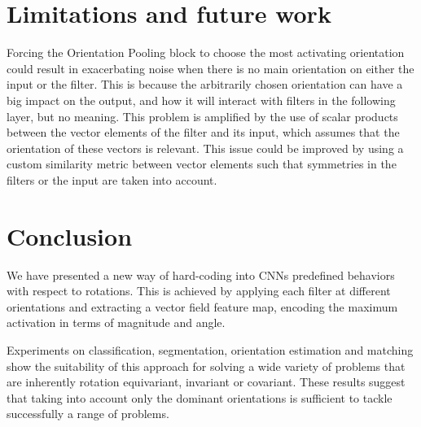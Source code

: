 \documentclass[10pt,twocolumn,letterpaper,table]{article}
\begin{document}
\section{Limitations and future work}
Forcing the Orientation Pooling block to choose the most activating orientation could result in exacerbating noise when there is no main orientation on either the input or the filter. This is because the arbitrarily chosen orientation can have a big impact on the output, and how it will interact with filters in the following layer, but no meaning. This problem is amplified by the use of scalar products between the vector elements of the filter and its input, which assumes that the orientation of these vectors is relevant. This issue could be improved by using a custom similarity metric between vector elements such that symmetries in the filters or the input are taken into account.

	
\section{Conclusion}
	
We have presented a new way of hard-coding into CNNs predefined behaviors with respect to rotations. This is achieved by applying each filter at different orientations and extracting a vector field feature map, encoding the maximum activation in terms of magnitude and angle. 

Experiments on classification, segmentation, orientation estimation and matching show the suitability of this approach for solving a wide variety of problems that are inherently rotation equivariant, invariant or covariant. These results suggest that taking into account only the dominant orientations is sufficient to tackle successfully a range of problems.
	
{\small
	
	
}
	
\end{document}
